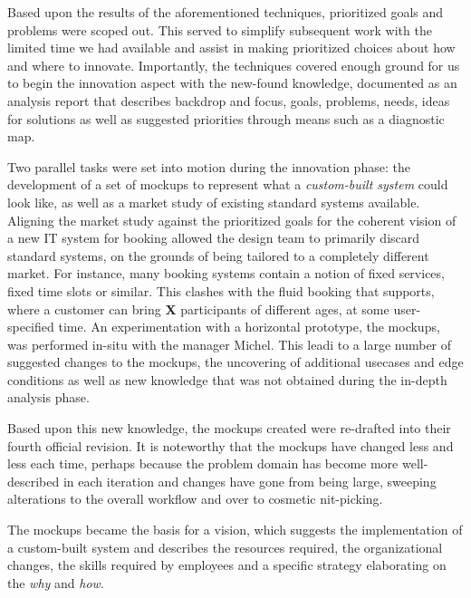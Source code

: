 Based upon the results of the aforementioned techniques, prioritized goals and
problems were scoped out. This served to simplify subsequent work with the
limited time we had available and assist in making prioritized choices about how and
where to innovate. Importantly, the techniques covered enough ground for us to
begin the innovation aspect with the new-found knowledge, documented as an
analysis report\cite[p. 159]{bodker2004participatory} that describes backdrop
and focus, goals, problems, needs, ideas for solutions as well as suggested
priorities through means such as a diagnostic map.

Two parallel tasks were set into motion during the innovation phase: the
development of a set of mockups to represent what a \textit{custom-built system}
could look like, as well as a market study of existing standard systems
available. Aligning the market study against the prioritized goals for the
coherent vision of a new IT system for booking allowed the design team to
primarily discard standard systems, on the grounds of being tailored to a
completely different market. For instance, many booking systems contain a notion
of fixed services, fixed time slots or similar. This clashes with the fluid
booking that \gomonkey{} supports, where a customer can bring \textbf{X}
participants of different ages, at some user-specified time. An experimentation
with a horizontal prototype, the mockups, was performed in-situ with the manager
Michel. This leadi to a large number of suggested changes to the mockups, the uncovering of
additional usecases and edge conditions as well as new knowledge that was not obtained
during the in-depth analysis phase.

Based upon this new knowledge, the mockups created were re-drafted into their
fourth official revision. It is noteworthy that the mockups have changed less
and less each time, perhaps because the problem domain has become more
well-described in each iteration and changes have gone from being large,
sweeping alterations to the overall workflow and over to cosmetic nit-picking.

The mockups became the basis for a vision, which suggests the implementation of
a custom-built system and describes the resources required, the organizational
changes, the skills required by employees and a specific strategy elaborating on
the \textit{why} and \textit{how}.

